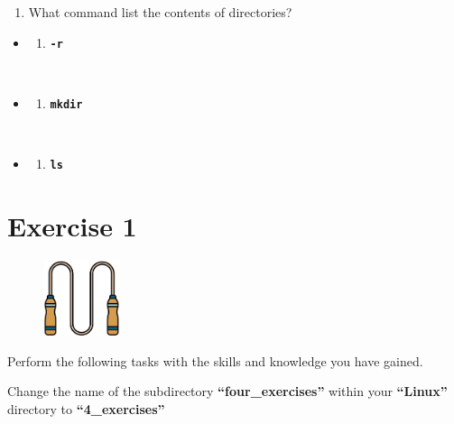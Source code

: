 \documentclass[
  letterpaper,
  DIV=11,
  numbers=noendperiod]{scrreprt}
\providecommand{\tightlist}{%
  \setlength{\itemsep}{0pt}\setlength{\parskip}{0pt}}\usepackage{longtable,booktabs,array}
\begin{document}
\begin{enumerate}
\def\labelenumi{\arabic{enumi}.}
\setcounter{enumi}{4}
\tightlist
\item
  What command list the contents of directories?
\end{enumerate}

\begin{itemize}
\item
  \begin{enumerate}
  \def\labelenumi{(\Alph{enumi})}
  \tightlist
  \item
    \textbf{\texttt{-r}}\strut \\
  \end{enumerate}
\item
  \begin{enumerate}
  \def\labelenumi{(\Alph{enumi})}
  \setcounter{enumi}{1}
  \tightlist
  \item
    \textbf{\texttt{mkdir}}\strut \\
  \end{enumerate}
\item
  \begin{enumerate}
  \def\labelenumi{(\Alph{enumi})}
  \setcounter{enumi}{2}
  \tightlist
  \item
    \textbf{\texttt{ls}}
  \end{enumerate}
\end{itemize}

\hypertarget{exercise-1}{%
\chapter{Exercise 1}\label{exercise-1}}

\begin{figure}

{\centering \includegraphics[width=0.2\textwidth,height=\textheight]{figures/exercise.png}

}

\end{figure}

Perform the following tasks with the skills and knowledge you have
gained.

Change the name of the subdirectory \textbf{``four\_exercises''} within
your \textbf{``Linux''} directory to \textbf{``4\_exercises''}
\end{document}
